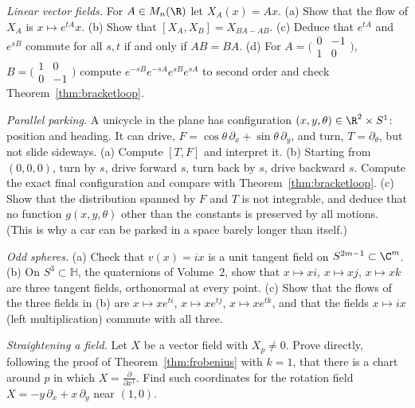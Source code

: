 \begin{exercise}[$\star$]\label{ex:linearfields}
\emph{Linear vector fields.} For $A\in M_n(\R)$ let $X_A(x)=Ax$. (a) Show that the flow of $X_A$ is $x\mapsto e^{tA}x$. (b) Show that $[X_A,X_B]=X_{BA-AB}$.
(c) Deduce that $e^{tA}$ and $e^{sB}$ commute for all $s,t$ if and only if $AB=BA$. (d) For $A=\bigl(\begin{smallmatrix}0&-1\\1&0\end{smallmatrix}\bigr)$, $B=\bigl(\begin{smallmatrix}1&0\\0&-1\end{smallmatrix}\bigr)$ compute
$e^{-sB}e^{-sA}e^{sB}e^{sA}$ to second order and check Theorem~\ref{thm:bracketloop}.
\end{exercise}

\begin{exercise}[$\star\star$]\label{ex:parking}
\emph{Parallel parking.} A unicycle in the plane has configuration $(x,y,\theta)\in\R^2\times S^1$: position and heading. It can drive,
$F=\cos\theta\,\partial_x+\sin\theta\,\partial_y$, and turn, $T=\partial_\theta$, but not slide sideways. (a) Compute $[T,F]$ and interpret it. (b) Starting
from $(0,0,0)$, turn by $s$, drive forward $s$, turn back by $s$, drive backward $s$. Compute the exact final configuration and compare with
Theorem~\ref{thm:bracketloop}. (c) Show that the distribution spanned by $F$ and $T$ is not integrable, and deduce that no function $g(x,y,\theta)$ other than
the constants is preserved by all motions. (This is why a car can be parked in a space barely longer than itself.)
\end{exercise}

\begin{exercise}[$\star$]\label{ex:hairyodd}
\emph{Odd spheres.} (a) Check that $v(x)=ix$ is a unit tangent field on $S^{2m-1}\subset\C^m$. (b) On $S^3\subset\mathbb{H}$, the quaternions of Volume~2, show that
$x\mapsto xi$, $x\mapsto xj$, $x\mapsto xk$ are three tangent fields, orthonormal at every point. (c) Show that the flows of the three fields in (b) are
$x\mapsto xe^{ti}$, $x\mapsto xe^{tj}$, $x\mapsto xe^{tk}$, and that the fields $x\mapsto ix$ (left multiplication) commute with all three.
\end{exercise}

\begin{exercise}[$\star\star$]\label{ex:straighten}
\emph{Straightening a field.} Let $X$ be a vector field with $X_p\ne0$. Prove directly, following the proof of Theorem~\ref{thm:frobenius} with $k=1$, that
there is a chart around $p$ in which $X=\frac\partial{\partial x^1}$. Find such coordinates for the rotation field $X=-y\,\partial_x+x\,\partial_y$ near $(1,0)$.
\end{exercise}

